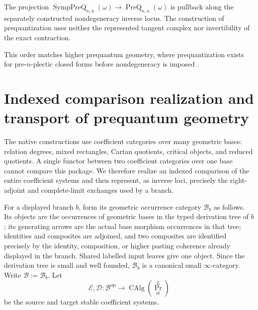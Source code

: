 \begin{proposition}
\label{prop:prequantum-precedes-nondegeneracy}
The projection
$\operatorname{SympPreQ}_{\kappa,u}(\omega)\to
\operatorname{PreQ}_{\kappa,u}(\omega)$ is pullback along the separately
constructed nondegeneracy inverse locus.  The construction of prequantization uses
neither the represented tangent complex nor invertibility of the exact contraction.
\end{proposition}

This order matches higher prequantum geometry, where prequantization exists for
pre-$n$-plectic closed forms before nondegeneracy is imposed
\cite{FiorenzaRogersSchreiber2013,Schreiber2016}.

\section{Indexed comparison realization and transport of prequantum geometry}
\label{sec:prequantum-comparison-transport}

The native constructions use coefficient categories over many geometric bases:
relation degrees, mixed rectangles, Cartan quotients, critical objects, and
reduced quotients.  A single functor between two coefficient categories over one
base cannot compare this package.  We therefore realize an indexed comparison of
the entire coefficient systems and then represent, as inverse loci, precisely
the right-adjoint and complete-limit exchanges used by a branch.

For a displayed branch $b$, form its geometric occurrence category
$\mathcal B_b$ as follows.  Its objects are the occurrences of geometric bases
in the typed derivation tree of $b$; its generating arrows are the actual base
morphism occurrences in that tree; identities and composites are adjoined, and
two composites are identified precisely by the identity, composition, or higher
pasting coherence already displayed in the branch.  Shared labelled input
leaves give one object.  Since the derivation tree is small and well founded,
$\mathcal B_b$ is a canonical small $\infty$-category.  Write
$\mathcal B:=\mathcal B_b$.  Let
\[
\mathcal E,\mathcal D:
\mathcal B^{\mathrm{op}}
\longrightarrow
\operatorname{CAlg}(\operatorname{Pr}^{L}_{\mathrm{st}})
\]
be the source and target stable coefficient systems.

